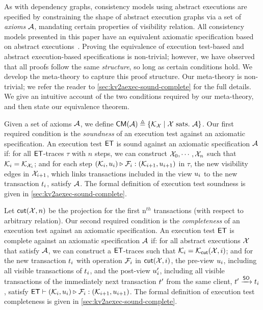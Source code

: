 As with dependency graphs, consistency models using abstract executions are specified by constraining the shape of abstract execution graphs via a set of \emph{axioms} $\mathcal{A}$, \eg mandating certain properties of visibility relation. %
All consistency models presented in this paper have an equivalent axiomatic specification based on abstract executions~\cite{framework-concur,laws}. 
Proving the equivalence of execution test-based and abstract execution-based specifications is non-trivial; 
however, we have observed that all proofs follow the same \emph{structure}, so long as certain conditions hold. 
We develop the meta-theory to capture this proof structure.
Our meta-theory is non-trivial; we refer the reader to \cref{sec:kv2aexec-sound-complete} for the full details. 
We give an intuitive account of the two conditions required by our meta-theory, and then state our equivalence theorem. 

Given a set of axioms $\mathcal{A}$, we define $\mathsf{CM}(\mathcal{A}) \triangleq \{\mathcal{K}_{\mathcal{X}} \mid \mathcal{X} \text{ sats.\ } \mathcal{A} \}$.
Our first required condition is the \emph{soundness} of an execution test against an axiomatic specification.
An execution test $\mathsf{ET}$ is sound against an axiomatic specification $\mathcal{A}$ if:
for all \( \mathsf{ET} \)-traces \( \tau \) with \( n \) steps, 
we can construct \( \mathcal{X}_0, \cdots, \mathcal{X}_n \) such that \( \mathcal{K}_i = \mathcal{K}_{\mathcal{X}_i} \); and
for each step \( (\mathcal{K}_i, u_i) \triangleright_{} \mathcal{F}_i : (\mathcal{K}_{i+1}, u_{i+1}) \) in \( \tau \),
the new visibility edges in \( \mathcal{X}_{i+1} \), which links transactions included in the view \( u_i \) to the new transaction \( t_i \),
 satisfy \( \mathcal{A} \).
The formal definition of execution test soundness is given in \cref{sec:kv2aexec-sound-complete}.


Let \( \mathsf{cut}(\mathcal{X},n) \) be the projection for the first n\(^{th}\) transactions (with respect to arbitrary relation).
Our second required condition is the \emph{completeness} of an execution test against an axiomatic specification.
An execution test $\mathsf{ET}$ is complete against an axiomatic specification $\mathcal{A}$ if:
for all abstract executions \( \mathcal{X} \) that satisfy \( \mathcal{A} \), 
we can construct a \( \mathsf{ET} \)-traces such that \( \mathcal{K}_i = \mathcal{K}_{\mathsf{cut}}(\mathcal{X},i) \); and
for the new transaction \( t_i \) with operation \( \mathcal{F}_i \) in \( \mathsf{cut}(\mathcal{X},i) \),
the pre-view \( u_i \), including all visible transactions of \( t_i \),
and the post-view \( u'_i \), including all visible transactions of the immediately next transaction \( t' \) from the same client, \( t' \xrightarrow{\mathsf{SO}} t_i \),
satisfy
\( \mathsf{ET} \vdash (\mathcal{K}_i, u_i) \triangleright_{} \mathcal{F}_i : (\mathcal{K}_{i+1}, u_{i+1}) \).
The formal definition of execution test completeness is given in \cref{sec:kv2aexec-sound-complete}.
%

